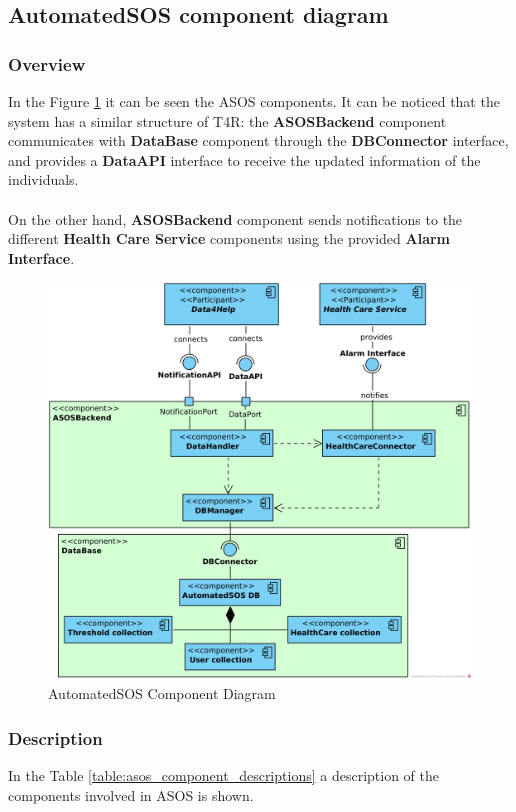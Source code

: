 \documentclass[a4paper, hidelinks, 12pt]{report}
\begin{document}
			\subsection{AutomatedSOS component diagram}
				\subsubsection{Overview}
			In the Figure \ref{fig:asos_component_diagram} it can be seen the ASOS components. It can be noticed that the system has a similar structure of T4R: the \textbf{ASOSBackend} component communicates  with \textbf{DataBase} component through the \textbf{DBConnector} interface, and provides a \textbf{DataAPI} interface to receive the updated information of the individuals.\\\\
			On the other hand, \textbf{ASOSBackend} component sends notifications to the different \textbf{Health Care Service} components using the provided \textbf{Alarm Interface}.
			\begin{figure}[H]
				\centering
				\includegraphics[width=1\textwidth]{diagrams/asos_component_diagram.png}
				\caption[AutomatedSOS Component Diagram]{AutomatedSOS Component Diagram}
				\label{fig:asos_component_diagram}
			\end{figure}	
			\subsubsection{Description}
			In the Table \ref{table:asos_component_descriptions} a description of the components involved in ASOS is shown.
			
\end{document}
